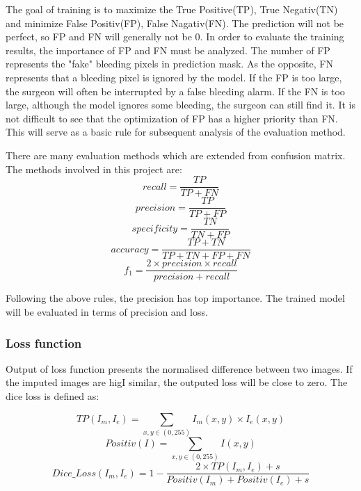 \documentclass[10pt,journal,compsoc]{IEEEtran}
\begin{document}
The goal of training is to maximize the True Positive(TP), True Negativ(TN) and minimize False Positiv(FP), False Nagativ(FN).
The prediction will not be perfect, so FP and FN will generally not be 0. 
In order to evaluate the training results, the importance of FP and FN must be analyzed.
The number of FP represents the "fake" bleeding pixels in prediction mask.
As the opposite, FN represents that a bleeding pixel is ignored by the model.
If the FP is too large, the surgeon will often be interrupted by a false bleeding alarm. 
If the FN is too large, although the model ignores some bleeding, the surgeon can still find it.
It is not difficult to see that the optimization of FP has a higher priority than FN.
This will serve as a basic rule for subsequent analysis of the evaluation method.
\par
There are many evaluation methods which are extended from confusion matrix. 
The methods involved in this project are:
\begin{equation} recall = \frac{TP}{TP + FN} \end{equation}
\begin{equation} precision = \frac{TP}{TP + FP} \end{equation}
\begin{equation} specificity = \frac{TN}{TN + FP} \end{equation}
\begin{equation} accuracy = \frac{TP + TN}{TP + TN + FP + FN} \end{equation}
\begin{equation} f_1 = \frac{2 \times precision \times recall }{precision + recall} \end{equation}

\par
Following the above rules, the precision has top \linebreak importance.
The trained model will be evaluated in terms of precision and loss.

\subsubsection{Loss function}
Output of loss function presents the normalised difference between two images. 
If the imputed images are higI similar, the outputed loss will be close to zero.
The dice loss \cite{diceloss} is defined as:

\begin{equation} TP(I_m, I_e) = \sum_{x,y\in (0, 255)} I_m(x,y) \times I_e(x,y) \end{equation}
\begin{equation} Positiv(I) = \sum_{x,y\in (0, 255)}I(x,y) \end{equation}
\begin{equation} Dice\_Loss(I_m, I_e) = 1 - \frac{ 2 \times TP(I_m, I_e) + s }{ Positiv(I_m) + Positiv(I_e) + s } \end{equation}
\end{document}
